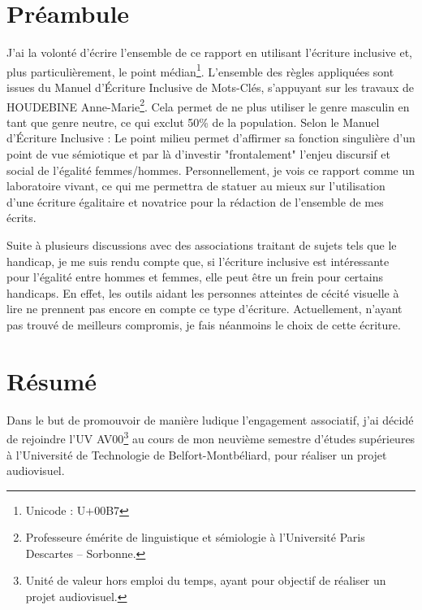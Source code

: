 \documentclass{librairies/lib}
\begin{document}



\newpage
\pagestyle{no_number}

\section*{Préambule}

J'ai la volonté d'écrire l'ensemble de ce rapport en utilisant l'écriture inclusive et, plus particulièrement, le point médian\footnote{Unicode : U+00B7}.
L'ensemble des règles appliquées sont issues du Manuel d’Écriture Inclusive\cite{MEI} de Mots-Clés, s'appuyant sur les travaux de HOUDEBINE Anne-Marie\footnote{Professeure émérite de linguistique et sémiologie à l'Université Paris Descartes – Sorbonne.}.
Cela permet de ne plus utiliser le genre masculin en tant que genre neutre, ce qui exclut 50\% de la population.
Selon le Manuel d’Écriture Inclusive : \og Le point milieu permet d'affirmer sa fonction singulière d'un point de vue sémiotique et par là d'investir "frontalement" l'enjeu discursif et social de l'égalité femmes/hommes. \fg{}
Personnellement, je vois ce rapport comme un laboratoire vivant, ce qui me permettra de statuer au mieux sur l'utilisation d'une écriture égalitaire et novatrice pour la rédaction de l'ensemble de mes écrits.

Suite à plusieurs discussions avec des associations traitant de sujets tels que le handicap, je me suis rendu compte que, si l'écriture inclusive est intéressante pour l'égalité entre hommes et femmes, elle peut être un frein pour certains handicaps.
En effet, les outils aidant les personnes atteintes de cécité visuelle à lire ne prennent pas encore en compte ce type d'écriture.
Actuellement, n'ayant pas trouvé de meilleurs compromis, je fais néanmoins le choix de cette écriture.


\newpage


\section*{Résumé}

Dans le but de promouvoir de manière ludique l'engagement associatif, j'ai décidé de rejoindre l'UV AV00\footnote{Unité de valeur hors emploi du temps, ayant pour objectif de réaliser un projet audiovisuel.} au cours de mon neuvième semestre d'études supérieures à l'Université de Technologie de Belfort-Montbéliard, pour réaliser un projet audiovisuel.
\end{document}
